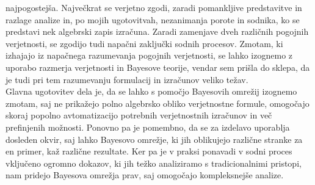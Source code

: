 \documentclass[fin1, tisk]{fmfdelo}
\theoremstyle{definition}
\theoremstyle{trditev}
\theoremstyle{izrek}
\begin{document}
najpogostejša. Največkrat se verjetno zgodi, zaradi pomankljive predstavitve in razlage analize in, po mojih ugotovitvah, nezanimanja porote in sodnika, ko se predstavi
nek algebrski zapis izračuna. Zaradi zamenjave dveh različnih pogojnih verjetnosti, se zgodijo tudi napačni zaključki sodnih procesov. Zmotam, ki izhajajo iz napačnega
razumevanja pogojnih verjetnosti, se lahko izognemo z uporabo razmerja verjetnosti in Bayesove teorije, vendar sem prišla do sklepa, da je tudi pri tem razumevanju
formulacij in izračunov veliko težav. \\
Glavna ugotovitev dela je, da se lahko s pomočjo Bayesovih omrežij izognemo zmotam, saj ne prikažejo polno algebrsko obliko verjetnostne formule, omogočajo skoraj popolno
avtomatizacijo potrebnih verjetnostnih izračunov in več prefinjenih možnosti. Ponovno pa je pomembno, da se za izdelavo uporablja dosleden okvir, saj lahko Bayesovo omrežje,
ki jih oblikujejo različne stranke za en primer, kaž različne rezultate. Ker pa je v praksi ponavadi v sodni proces vključeno ogromno dokazov, ki jih težko analiziramo s
tradicionalnimi pristopi, nam pridejo Bayesova omrežja prav, saj omogočajo kompleksnejše analize.

\end{document}
